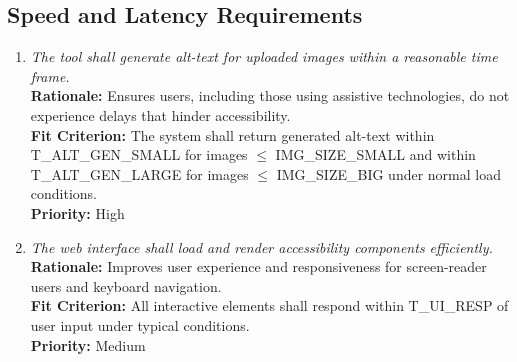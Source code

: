 \documentclass[12pt]{article}
\begin{document}
\subsection{Speed and Latency Requirements}
\begin{enumerate}[label=PR-SL \arabic*., wide=0pt, leftmargin=*]
\item \emph{The tool shall generate alt-text for uploaded images within a reasonable time frame.}\\[2mm] 
    {\bf Rationale:} Ensures users, including those using assistive technologies, do not experience delays that hinder accessibility.\\
    {\bf Fit Criterion:} The system shall return generated alt-text within T\_ALT\_GEN\_SMALL for images $\leq$ IMG\_SIZE\_SMALL and within T\_ALT\_GEN\_LARGE for images $\leq$ IMG\_SIZE\_BIG under normal load conditions.\\
    {\bf Priority:} High

\item \emph{The web interface shall load and render accessibility components efficiently.}\\[2mm] 
    {\bf Rationale:} Improves user experience and responsiveness for screen-reader users and keyboard navigation.\\
    {\bf Fit Criterion:} All interactive elements shall respond within T\_UI\_RESP of user input under typical conditions.\\
    {\bf Priority:} Medium
\end{enumerate}
\end{document}

